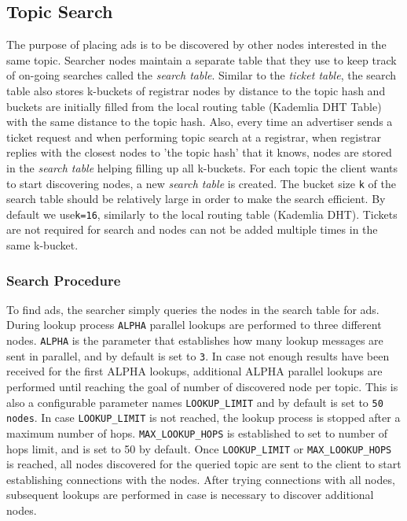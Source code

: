 \subsection{Topic Search}\label{sec:lookup}

The purpose of placing ads is to be discovered by other nodes interested in the same topic.  
Searcher nodes maintain a separate table that they use to keep track of on-going searches called the \emph{search table}. 
Similar to the \emph{ticket table}, the search table also stores k-buckets of registrar nodes by distance to the topic hash and buckets are initially filled from the local routing table (Kademlia DHT Table) with the same distance to the topic hash.
Also,  every time an advertiser sends a ticket request and when performing topic search at a registrar,  when registrar replies with the closest nodes to 'the topic hash' that it knows,  nodes are stored in the \emph{search table} helping filling up all k-buckets.
For each topic the client wants to start discovering nodes, a new \emph{search table} is created. 
The bucket size \texttt{k}  of the search table should be relatively large in order to make the search efficient. 
By default we use\texttt{k=16},  similarly to the local routing table (Kademlia DHT).
Tickets are not required for search and nodes can not be added multiple times in the same k-bucket.

\subsubsection{Search Procedure}

To find ads,  the searcher simply queries the nodes in the search table for ads. 
During lookup process \texttt{ALPHA} parallel lookups are performed to three different nodes. 
\texttt{ALPHA} is the parameter that establishes how many lookup messages are sent in parallel, and by default is set to \texttt{3}.
In case not enough results have been received for the first ALPHA lookups,  additional ALPHA parallel lookups are performed until
reaching the goal of number of discovered node per topic.
This is also a configurable parameter names \texttt{LOOKUP\_LIMIT} and by default is set to \texttt{50 nodes}. 
In case  \texttt{LOOKUP\_LIMIT}  is not reached, the lookup process is stopped after a maximum number of hops. 
\texttt{MAX\_LOOKUP\_HOPS} is established to set to number of hops limit, and is set to 50 by default.
Once  \texttt{LOOKUP\_LIMIT} or \texttt{MAX\_LOOKUP\_HOPS} is reached,  all nodes discovered for the queried topic are sent to the client to start establishing connections with the nodes.
After trying connections with all nodes,  subsequent lookups are performed in case is necessary to discover additional nodes.

